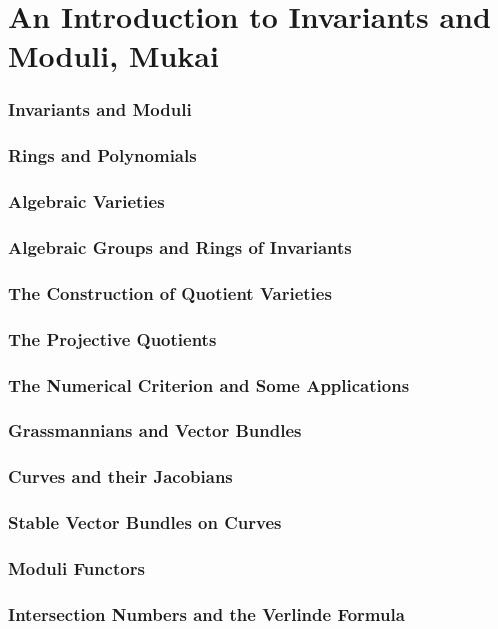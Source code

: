 \part{An Introduction to Invariants and Moduli, Mukai}

\section{Invariants and Moduli}

\section{Rings and Polynomials}

\section{Algebraic Varieties}

\section{Algebraic Groups and Rings of Invariants}

\section{The Construction of Quotient Varieties}

\section{The Projective Quotients}

\section{The Numerical Criterion and Some Applications}

\section{Grassmannians and Vector Bundles}

\section{Curves and their Jacobians}

\section{Stable Vector Bundles on Curves}

\section{Moduli Functors}

\section{Intersection Numbers and the Verlinde Formula}
